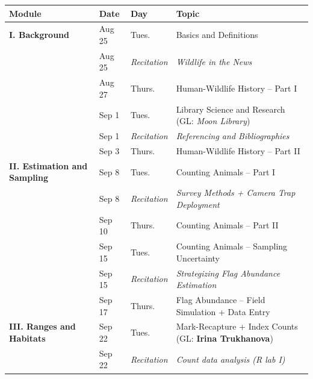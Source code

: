 \documentclass[
  letterpaper,
  DIV=11,
  numbers=noendperiod]{scrartcl}
\newcounter{none} %
\begin{document}
{\def\LTcaptype{none} %
\begin{longtable}[]{@{}
  >{\raggedright\arraybackslash}p{}
  >{\raggedright\arraybackslash}p{}
  >{\raggedright\arraybackslash}p{}
  >{\raggedright\arraybackslash}p{}@{}}
\toprule\noalign{}
\begin{minipage}[b]{\linewidth}\raggedright
Module
\end{minipage} & \begin{minipage}[b]{\linewidth}\raggedright
Date
\end{minipage} & \begin{minipage}[b]{\linewidth}\raggedright
Day
\end{minipage} & \begin{minipage}[b]{\linewidth}\raggedright
Topic
\end{minipage} \\
\midrule\noalign{}
\endhead
\bottomrule\noalign{}
\endlastfoot
\textbf{I. Background} & Aug 25 & Tues. & Basics and Definitions \\
& Aug 25 & \emph{Recitation} & \emph{Wildlife in the News} \\
& Aug 27 & Thurs. & Human-Wildlife History -- Part I \\
& Sep 1 & Tues. & Library Science and Research (GL: \emph{Moon
Library}) \\
& Sep 1 & \emph{Recitation} & \emph{Referencing and Bibliographies} \\
& Sep 3 & Thurs. & Human-Wildlife History -- Part II \\
\textbf{II. Estimation and Sampling} & Sep 8 & Tues. & Counting Animals
-- Part I \\
& Sep 8 & \emph{Recitation} & \emph{Survey Methods + Camera Trap
Deployment} \\
& Sep 10 & Thurs. & Counting Animals -- Part II \\
& Sep 15 & Tues. & Counting Animals -- Sampling Uncertainty \\
& Sep 15 & \emph{Recitation} & \emph{Strategizing Flag Abundance
Estimation} \\
& Sep 17 & Thurs. & Flag Abundance -- Field Simulation + Data Entry \\
\textbf{III. Ranges and Habitats} & Sep 22 & Tues. & Mark-Recapture +
Index Counts (GL: \textbf{Irina Trukhanova}) \\
& Sep 22 & \emph{Recitation} & \emph{Count data analysis (R lab I)} \\

\end{longtable}}
\end{document}
